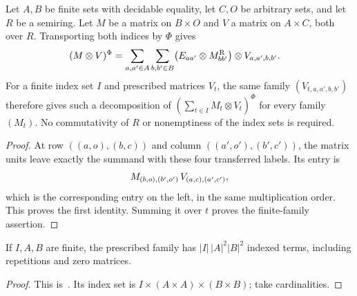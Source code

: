 \begin{lemma}
    \label{thm:chain_middle_factor_exchange}
    \leanok
    Let $A,B$ be finite sets with decidable equality, let $C,O$ be arbitrary
    sets, and let $R$ be a semiring. Let $M$ be a matrix on $B\times O$ and $V$
    a matrix on $A\times C$, both over $R$. Transporting both indices by $\Phi$ gives
    \begin{align}
        (M\otimes V)^\Phi
         & =\sum_{a,a'\in A}\sum_{b,b'\in B}
        \bigl(E_{aa'}\otimes M^{\mathrm R}_{bb'}\bigr)\otimes V_{a,a',b,b'}.\notag
    \end{align}
    For a finite index set $I$ and prescribed matrices $V_t$, the same
    family $(V_{t,a,a',b,b'})$ therefore gives such a decomposition of
    $(\sum_{t\in I}M_t\otimes V_t)^\Phi$ for every family $(M_t)$.
    No commutativity of $R$ or nonemptiness of the index sets is required.
\end{lemma}
\begin{proof}\leanok
    At row $((a,o),(b,c))$ and column $((a',o'),(b',c'))$, the matrix
    units leave exactly the summand with these four transferred labels.
    Its entry is
    \begin{align}
        M_{(b,o),(b',o')}\,V_{(a,c),(a',c')},\notag
    \end{align}
    which is the corresponding entry on the left, in the same
    multiplication order. This proves the first identity. Summing it over
    $t$ proves the finite-family assertion.
\end{proof}

\begin{lemma}
    \label{thm:chain_middle_factor_exchange_card}
    \leanok
    If $I,A,B$ are finite, the prescribed family has $|I|\,|A|^2|B|^2$ indexed
    terms, including repetitions and zero matrices.
\end{lemma}
\begin{proof}\leanok
    This is~\cite[``Number of exchanged middle factors'']{QICLean2026Blueprint}.
    Its index set is $I\times(A\times A)\times(B\times B)$; take cardinalities.
\end{proof}
